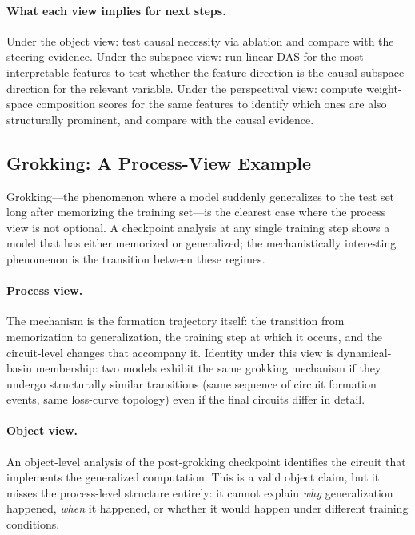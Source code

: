 \documentclass[11pt]{article}
\theoremstyle{remark}
\begin{document}
\paragraph{What each view implies for next steps.}
Under the object view: test causal necessity via ablation and compare
with the steering evidence.  Under the subspace view: run linear DAS
for the most interpretable features to test whether the feature
direction is the causal subspace direction for the relevant variable.
Under the perspectival view: compute weight-space composition scores
for the same features to identify which ones are also structurally
prominent, and compare with the causal evidence.

\subsection{Grokking: A Process-View Example}

Grokking---the phenomenon where a model suddenly generalizes to the test
set long after memorizing the training set---is the clearest case where
the process view is not optional.  A checkpoint analysis at any single
training step shows a model that has either memorized or generalized;
the mechanistically interesting phenomenon is the transition between
these regimes.

\paragraph{Process view.}
The mechanism is the formation trajectory itself: the transition from
memorization to generalization, the training step at which it occurs,
and the circuit-level changes that accompany it.  Identity under this
view is dynamical-basin membership: two models exhibit the same grokking
mechanism if they undergo structurally similar transitions (same
sequence of circuit formation events, same loss-curve topology) even if
the final circuits differ in detail.

\paragraph{Object view.}
An object-level analysis of the post-grokking checkpoint identifies the
circuit that implements the generalized computation.  This is a valid
object claim, but it misses the process-level structure entirely: it
cannot explain \emph{why} generalization happened, \emph{when} it
happened, or whether it would happen under different training conditions.
\end{document}
